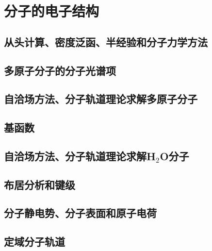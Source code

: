 \chapter{分子的电子结构}
\label{chap:15}
\section{从头计算、密度泛函、半经验和分子力学方法}
\label{sec:15.1 Ab Initio, Density-Functional, Semiempirical and Molecular-Mechanics Methods}

\section{多原子分子的分子光谱项}
\label{sec:15.2 Electronic Terms of Polyatomic Molecules}

\section{自洽场方法、分子轨道理论求解多原子分子}
\label{sec:15.3 The SCF MO Treatment of Polyatomic Molecules}

\section{基函数}
\label{sec:15.4 Basis Functions}

\section{自洽场方法、分子轨道理论求解H$_2$O分子}
\label{sec:15.5 The SCF MO Treatment of the H$_2$O}

\section{布居分析和键级}
\label{sec:15.6 Population Analysis and Bond Orders}

\section{分子静电势、分子表面和原子电荷}
\label{sec:15.7 The Molecular Electrostatic Potential, Molecular Surfaces, and Atomic Charges}

\section{定域分子轨道}
\label{sec:15.8 Localized Molecular Orbitals}

